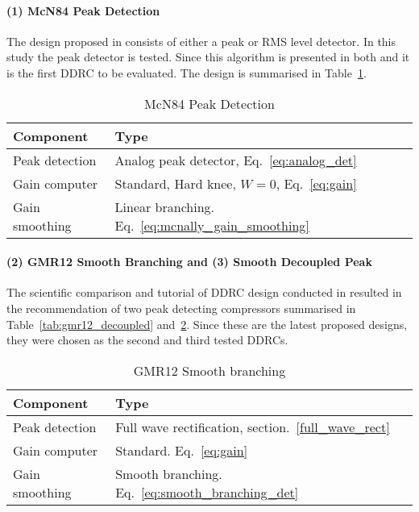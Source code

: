 \documentclass[../main2.tex]{subfiles}
\begin{document}
\paragraph{(1) McN84 Peak Detection}
The design proposed in \cite{mcnally1984dynamic} consists of either a peak or RMS level detector. In this study the peak detector is tested. Since this algorithm is presented in both \cite{zolzer2008digital} and \cite{dafx11} it is the first DDRC to be evaluated. The design is summarised in Table~\ref{tab:mcn84}.
\begin{table}[h]
\begin{center}
\caption{McN84 Peak Detection}
\label{tab:mcn84}
\begin{tabular}{| l | l |}
	\hline
	Component & Type \\ \hline
	Peak detection & Analog peak detector, Eq.~\eqref{eq:analog_det} \\
	Gain computer & Standard, Hard knee, $W=0$, Eq.~\eqref{eq:gain} \\
	Gain smoothing & Linear branching. Eq.~\eqref{eq:mcnally_gain_smoothing} \\
	\hline
\end{tabular}
\end{center}
\end{table}
\paragraph{(2) GMR12 Smooth Branching and (3) Smooth Decoupled Peak}
The scientific comparison and tutorial of DDRC design conducted in \cite{reiss2012tutorial} resulted in the recommendation of two peak detecting compressors summarised in Table~\ref{tab:gmr12_decoupled} and~\ref{tab:gmr12_branching}. Since these are the latest proposed designs, they were chosen as the second and third tested DDRCs.
\begin{table}[h]
\begin{center}
\caption{GMR12 Smooth branching}
\label{tab:gmr12_branching}
\begin{tabular}{| l | l |}
	\hline
	Component & Type \\ \hline
	Peak detection & Full wave rectification, section.~\ref{full_wave_rect} \\
	Gain computer & Standard. Eq.~\eqref{eq:gain} \\
	Gain smoothing & Smooth branching. Eq.~\eqref{eq:smooth_branching_det} \\
	\hline
\end{tabular}
\end{center}
\end{table}
\end{document}
